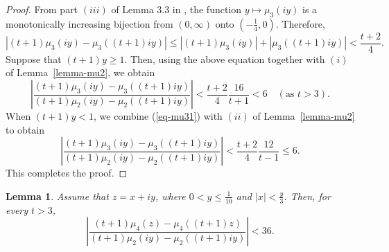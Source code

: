 \documentclass[11pt]{amsart}
\theoremstyle{plain}
\newtheorem{lemma}[theorem]{Lemma}
\numberwithin{equation}{section}
\begin{document}
		\begin{proof}
			From part $(iii)$ of Lemma 3.3 in \cite{tyler2024asymptotics}, the function $y\mapsto \mu_{3}(iy)$ is a monotonically increasing bijection from $(0,\infty)$ onto $\left(-\tfrac{1}{4},0\right)$. Therefore,
			\begin{equation}\label{eq-mu31}
				|(t+1)\mu_{3}(iy)-\mu_{3}((t+1)iy)|\le|(t+1)\mu_{3}(iy)|+|\mu_{3}((t+1)iy)|<\frac{t+2}{4}.    
			\end{equation}  
			Suppose that $(t+1)y \ge 1$. Then, using the above equation together with
			$(i)$ of Lemma~\ref{lemma-mu2}, we obtain
			\begin{equation*}
				\left|\frac{(t+1)\mu_{3}(iy)-\mu_{3}((t+1)iy)}{(t+1)\mu_{2}(iy)-\mu_{2}((t+1)iy)}\right|<\frac{t+2}{4}\frac{16}{t+1}<6\quad (\text{as $t>3$}) .  
			\end{equation*}
			When $(t+1)y < 1$, we combine (\ref{eq-mu31}) with $(ii)$ of Lemma~\ref{lemma-mu2} to obtain
			\begin{equation*}
				\left|\frac{(t+1)\mu_{3}(iy)-\mu_{3}((t+1)iy)}{(t+1)\mu_{2}(iy)-\mu_{2}((t+1)iy)}\right|<\frac{t+2}{4}\frac{12}{t-1}\le6.   
			\end{equation*}
			This completes the proof.
		\end{proof}
		\begin{lemma}\label{lemma-mu4}
			Assume that $z=x+iy$, where $0<y\le \frac{1}{10}$ and $|x|<\frac{y}{3}$. Then, for every $t>3$,
			\begin{equation*}
				\left|\frac{(t+1)\mu_{4}(z)-\mu_{4}((t+1)z)}{(t+1)\mu_{2}(iy)-\mu_{2}((t+1)iy)}\right|<36.   
			\end{equation*}         
		\end{lemma}
\end{document}
